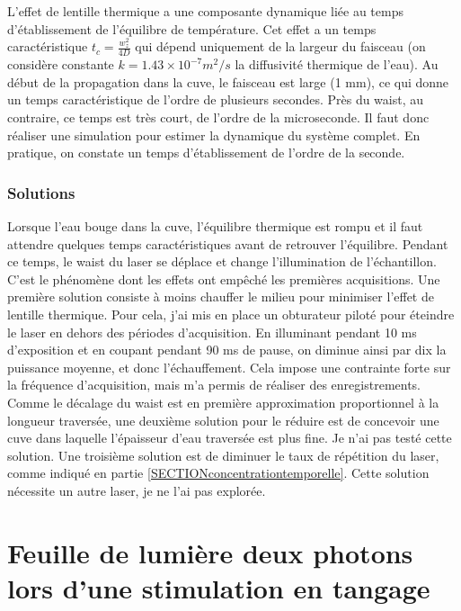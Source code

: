 L'effet de lentille thermique a une composante dynamique liée au temps d'établissement de l'équilibre de température. Cet effet a un temps caractéristique $t_c = \frac{w_z^2}{4D}$ qui dépend uniquement de la largeur du faisceau (on considère constante $k = 1.43\times 10^{-7} m^2/s$ la diffusivité thermique de l'eau). Au début de la propagation dans la cuve, le faisceau est large (1 mm), ce qui donne un temps caractéristique de l'ordre de plusieurs secondes. Près du waist, au contraire, ce temps est très court, de l'ordre de la microseconde. Il faut donc réaliser une simulation pour estimer la dynamique du système complet. 
En pratique, on constate un temps d'établissement de l'ordre de la seconde.

\subsubsection{Solutions}\label{solutionseffetthermique}

Lorsque l'eau bouge dans la cuve, l'équilibre thermique est rompu et il faut attendre quelques temps caractéristiques avant de retrouver l'équilibre. Pendant ce temps, le waist du laser se déplace et change l'illumination de l'échantillon. C'est le phénomène dont les effets ont empêché les premières acquisitions. Une première solution consiste à moins chauffer le milieu pour minimiser l'effet de lentille thermique. Pour cela, j'ai mis en place un obturateur piloté pour éteindre le laser en dehors des périodes d'acquisition. En illuminant pendant 10 ms d'exposition et en coupant pendant 90 ms de pause, on diminue ainsi par dix la puissance moyenne, et donc l'échauffement. Cela impose une contrainte forte sur la fréquence d'acquisition, mais m'a permis de réaliser des enregistrements.
Comme le décalage du waist est en première approximation proportionnel à la longueur traversée, une deuxième solution pour le réduire est de concevoir une cuve dans laquelle l'épaisseur d'eau traversée est plus fine. Je n'ai pas testé cette solution.
Une troisième solution est de diminuer le taux de répétition du laser, comme indiqué en partie \ref{SECTIONconcentrationtemporelle}. Cette solution nécessite un autre laser, je ne l'ai pas explorée.


\section[Tangage deux photons]{Feuille de lumière deux photons lors d'une stimulation en tangage}

